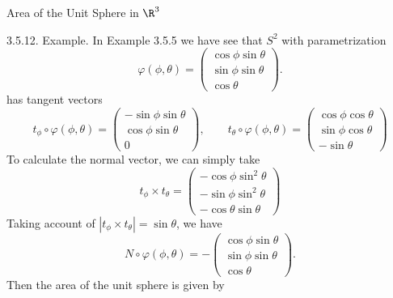 \documentclass[smaller,hyperref={CJKbookmarks=true}]{beamer}
\begin{document}
\begin{frame}{Area
of the Unit Sphere in $\R^3$}
\begin{spacing}{0.95}
\alert{3.5.12. Example.} In Example 3.5.5 we have see that $S^2$ with parametrization
\[\varphi(\phi,\theta)=\begin{pmatrix}
                         \cos\phi\sin\theta \\
                         \sin\phi\sin\theta \\
                         \cos\theta
                       \end{pmatrix}.\]
has tangent vectors
\[t_\phi\circ\varphi(\phi,\theta)=\begin{pmatrix}
                                    -\sin\phi\sin\theta \\
                                    \cos\phi\sin\theta \\
                                    0
                                  \end{pmatrix},\qquad
                                  t_\theta\circ\varphi(\phi,\theta)=\begin{pmatrix}
                                                                      \cos\phi\cos\theta \\
                                                                      \sin\phi\cos\theta \\
                                                                      -\sin\theta
                                                                    \end{pmatrix}\]
To calculate the normal vector, we can simply take
\[t_\phi\times t_\theta=\begin{pmatrix}
                          -\cos\phi\sin^2\theta \\
                          -\sin\phi\sin^2\theta \\
                          -\cos\theta\sin\theta
                        \end{pmatrix}\]
\newpage
Taking account of $|t_\phi\times t_\theta|=\sin\theta$, we have
\[N\circ\varphi(\phi,\theta)=-\begin{pmatrix}
                                \cos\phi\sin\theta \\
                                \sin\phi\sin\theta \\
                                \cos\theta
                              \end{pmatrix}.\]
Then the area of the unit sphere is given by

\end{spacing}
\end{frame}
\end{document}
